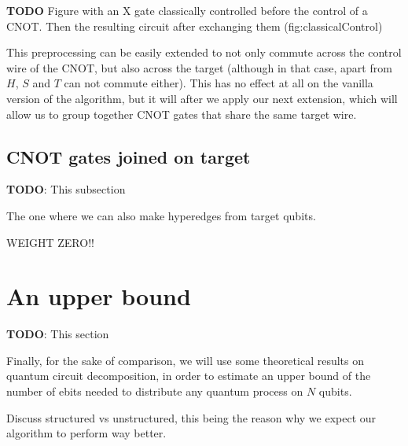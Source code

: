 \textbf{TODO} Figure with an X gate classically controlled before the control of a CNOT. Then the resulting circuit after exchanging them (fig:classicalControl)

This preprocessing can be easily extended to not only commute across the control wire of the CNOT, but also across the target (although in that case, apart from \(H\), \(S\) and \(T\) can not commute either). This has no effect at all on the vanilla version of the algorithm, but it will after we apply our next extension, which will allow us to group together CNOT gates that share the same target wire.



\subsection{CNOT gates joined on target}
\label{BothEnds}

\textbf{TODO}: This subsection

The one where we can also make hyperedges from target qubits.

WEIGHT ZERO!!

\section{An upper bound}

\textbf{TODO}: This section

Finally, for the sake of comparison, we will use some theoretical results on quantum circuit decomposition, in order to estimate an upper bound of the number of ebits needed to distribute any quantum process on \(N\) qubits.

Discuss structured vs unstructured, this being the reason why we expect our algorithm to perform way better.